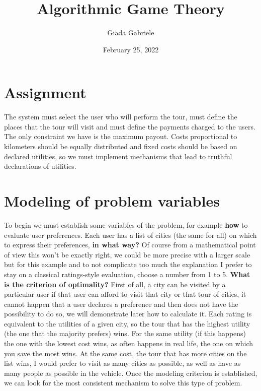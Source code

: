 \documentclass{article}
\title{Algorithmic Game Theory}
\author{Giada Gabriele}
\date{February 25, 2022}
\begin{document}
\maketitle
\section{Assignment}
\Large{
The system must select the user who will perform the tour, must define the places that the tour will visit and must define the payments charged to the users. The only constraint we have is the maximum payout. Costs proportional to kilometers should be equally distributed and fixed costs should be based on declared utilities, so we must implement mechanisms that lead to truthful declarations of utilities.
}
\section{Modeling of problem variables}
\Large{
To begin we must establish some variables of the problem, for example \textbf{how} to evaluate user preferences. Each user has a list of cities (the same for all) on which to express their preferences, \textbf{in what way?} Of course from a mathematical point of view this won't be exactly right, we could be more precise with a larger scale but for this example and to not complicate too much the explanation I prefer to stay on a classical ratings-style evaluation, choose a number from 1 to 5. \textbf{What is the criterion of optimality?} First of all, a city can be visited by a particular user if that user can afford to visit that city or that tour of cities, it cannot happen that a user declares a preference and then does not have the possibility to do so, we will demonstrate later how to calculate it. Each rating is equivalent to the utilities of a given city, so the tour that has the highest utility (the one that the majority prefers) wins. For the same utility (if this happens) the one with the lowest cost wins, as often happens in real life, the one on which you save the most wins. At the same cost, the tour that has more cities on the list wins, I would prefer to visit as many cities as possible, as well as have as many people as possible in the vehicle. Once the modeling criterion is established, we can look for the most consistent mechanism to solve this type of problem.
}
\end{document}
